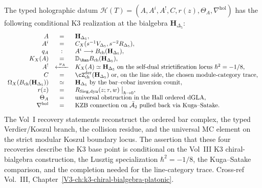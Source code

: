 \begin{remark}
\label{rem:fmhp-1}
The typed holographic datum
$\mathcal H(T) = (A, A^i, A^!, C, r(z), \Theta_A,
\nabla^{\mathrm{hol}})$ has the following conditional K3 realization
at the bialgebra $\mathbf H_{\Delta_5}$:
\[
\begin{array}{rcl}
A & = & \mathbf H_{\Delta_5}, \\
A^i & = & C_X(s^{-1}V_{\Delta_5},s^{-2}R_{\Delta_5}), \\
q_A & : & A^i\longrightarrow B_{\mathrm{ch}}(\mathbf H_{\Delta_5}), \\
K_X(A) & = & \mathbb D_{\Ran}B_{\mathrm{ch}}(\mathbf H_{\Delta_5}), \\
A^! & \xleftarrow{\ \nu_A\ } & K_X(A)
 \simeq \mathbf H_{\Delta_5}\ \text{on the self-dual
 strictification locus }\hbar^2=-1/8, \\
C & = & \cZ^{\mathrm{der}}_{\mathrm{ch}}(\mathbf H_{\Delta_5})
 \ \text{or, on the line side, the chosen module-category trace}, \\
\Omega_X(B_{\mathrm{ch}}(\mathbf H_{\Delta_5})) & \simeq
 & \mathbf H_{\Delta_5}
\ \text{by the bar--cobar inversion counit}, \\
r(z) & = & R_{\mathrm{Sieg,dyn}}(z;\tau,w)\bigm|_{\hbar\to 0}, \\
\Theta_A & = & \text{universal obstruction in the Hall ordered dGLA}, \\
\nabla^{\mathrm{hol}} & = & \text{KZB connection on $\bar{\mathcal A}_2$ pulled back via Kuga--Satake}.
\end{array}
\]
The Vol~I recovery statements reconstruct the ordered bar complex, the
typed Verdier/Koszul branch, the collision residue, and the universal
MC element on the strict modular Koszul boundary locus. The assertion
that these four recoveries describe the K3 base point is conditional on
the Vol~III K3 chiral-bialgebra construction, the Lusztig
specialization $\hbar^2=-1/8$, the Kuga--Satake comparison, and the
completion needed for the line-category trace. Cross-ref Vol.~III,
Chapter~\ref{V3-ch:k3-chiral-bialgebra-platonic}.
\end{remark}

